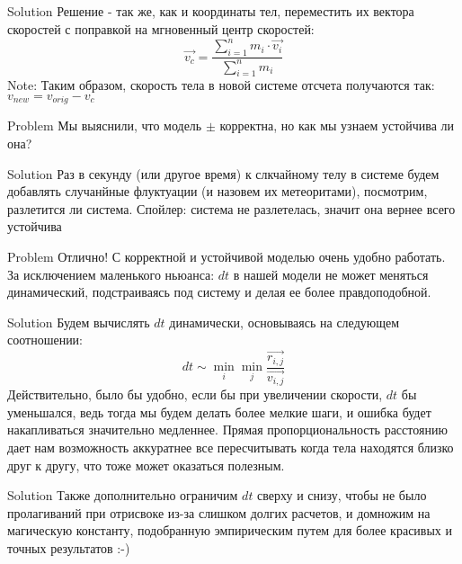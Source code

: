 \documentclass{beamer}
\begin{document}
\begin{frame}[fragile]{Solution}
  Решение - так же, как и координаты тел, переместить их вектора скоростей с поправкой на мгновенный центр скоростей:
  \[\overrightarrow{v_c} = \dfrac{\sum_{i = 1}^{n} m_i \cdot \overrightarrow{v_i}}{\sum_{i = 1}^{n} m_i}\]
  Note: Таким образом, скорость тела в новой системе отсчета получаются так: $v_{new} = v_{orig} - v_c$
\end{frame}

\begin{frame}[fragile]{Problem}
  Мы выяснили, что модель $\pm$ корректна, но как мы узнаем устойчива ли она?
\end{frame}

\begin{frame}[fragile]{Solution}
  Раз в секунду (или другое время) к слкчайному телу в системе будем добавлять случанйные флуктуации
  (и назовем их метеоритами), посмотрим, разлетится ли система.\newline
  Спойлер: система не разлетелась, значит она вернее всего устойчива
\end{frame}

\begin{frame}[fragile]{Problem}
  Отлично! С корректной и устойчивой моделью очень удобно работать. За исключением маленького ньюанса:
  $dt$ в нашей модели не может меняться динамический, подстраиваясь под систему и делая ее более правдоподобной.
\end{frame}

\begin{frame}[fragile]{Solution}
  Будем вычислять $dt$ динамически, основываясь на следующем соотношении:
  \[dt \sim \min_i \min_j \dfrac{\overrightarrow{r_{i,j}}}{\overrightarrow{v_{i,j}}}\]
  Действительно, было бы удобно, если бы при увеличении скорости, $dt$ бы уменьшался,
  ведь тогда мы будем делать более мелкие шаги, и ошибка будет накапливаться значительно медленнее.\newline
  Прямая пропорциональность расстоянию дает нам возможность аккуратнее все пересчитывать когда тела
  находятся близко друг к другу, что тоже может оказаться полезным.
\end{frame}

\begin{frame}[fragile]{Solution}
  Также дополнительно ограничим $dt$ сверху и снизу, чтобы не было пролагиваний при отрисвоке
  из-за слишком долгих расчетов, и домножим на магическую константу, подобранную эмпирическим
  путем для более красивых и точных результатов :-)
\end{frame}
\end{document}

